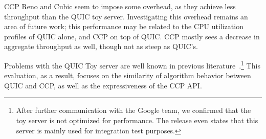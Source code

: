 CCP Reno and Cubic seem to impose some overhead, as they achieve less throughput than the QUIC toy server.
Investigating this overhead remains an area of future work; this performance may be related to the CPU utilization profiles of QUIC alone, and CCP on top of QUIC.
CCP mostly sees a decrease in aggregate throughput as well, though not as steep as QUIC's.

Problems with the QUIC Toy server are well known in previous literature~\cite{quic-imc}.\footnote{After further communication with the Google team, we confirmed that the toy server is not optimized for performance. The release even states that this server is mainly used for integration test purposes.}
This evaluation, as a result, focuses on the similarity of algorithm behavior between QUIC and CCP, as well as the expressiveness of the CCP API.


